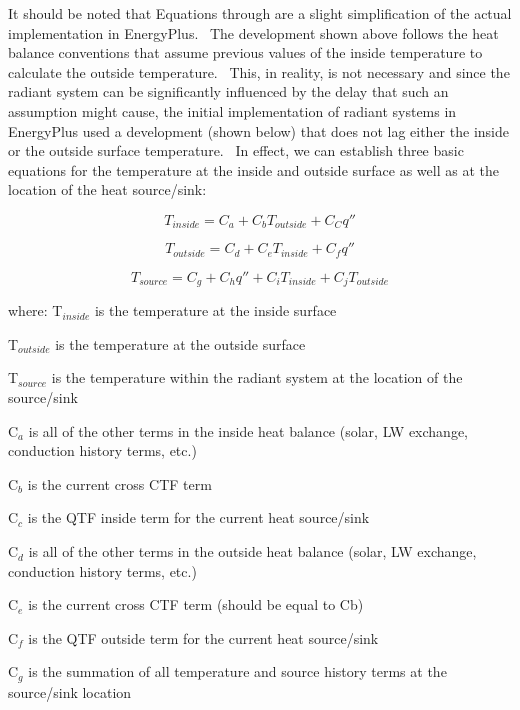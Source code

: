 It should be noted that Equations through are a slight simplification of the actual implementation in EnergyPlus.~ The development shown above follows the heat balance conventions that assume previous values of the inside temperature to calculate the outside temperature.~ This, in reality, is not necessary and since the radiant system can be significantly influenced by the delay that such an assumption might cause, the initial implementation of radiant systems in EnergyPlus used a development (shown below) that does not lag either the inside or the outside surface temperature.~ In effect, we can establish three basic equations for the temperature at the inside and outside surface as well as at the location of the heat source/sink:

\begin{equation}
{T_{inside}} = {C_a} + {C_b}{T_{outside}} + {C_C}q''
\end{equation}

\begin{equation}
{T_{outside}} = {C_d} + {C_e}{T_{inside}} + {C_f}q''
\end{equation}

\begin{equation}
{T_{source}} = {C_g} + {C_h}q'' + {C_i}{T_{inside}} + {C_j}{T_{outside}}
\end{equation}

where: T\(_{inside}\) is the temperature at the inside surface

T\(_{outside}\) is the temperature at the outside surface

T\(_{source}\) is the temperature within the radiant system at the location of the source/sink

C\(_{a}\) is all of the other terms in the inside heat balance (solar, LW exchange, conduction history terms, etc.)

C\(_{b}\) is the current cross CTF term

C\(_{c}\) is the QTF inside term for the current heat source/sink

C\(_{d}\) is all of the other terms in the outside heat balance (solar, LW exchange, conduction history terms, etc.)

C\(_{e}\) is the current cross CTF term (should be equal to Cb)

C\(_{f}\) is the QTF outside term for the current heat source/sink

C\(_{g}\) is the summation of all temperature and source history terms at the source/sink location

